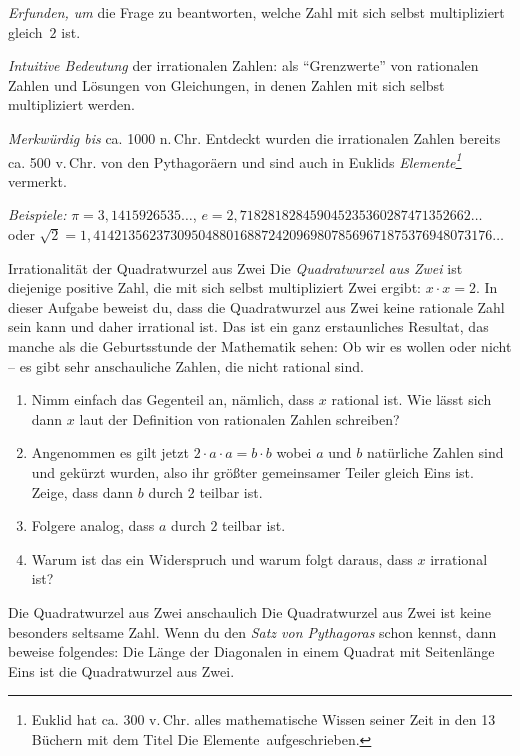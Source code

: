 \documentclass{zirkelblatt1415}
\begin{document}
\emph{Erfunden, um} die Frage zu beantworten, welche Zahl mit sich selbst multipliziert gleich~$2$ ist.

\emph{Intuitive Bedeutung} der irrationalen Zahlen: als "`Grenzwerte"' von rationalen Zahlen und Lösungen von Gleichungen, in denen Zahlen mit sich selbst multipliziert werden.

\emph{Merkwürdig bis} ca. 1000 n.\,Chr. Entdeckt wurden die irrationalen Zahlen bereits ca. 500 v.\,Chr. von den Pythagoräern und sind auch in Euklids \emph{Elemente\footnote{Euklid hat ca. 300 v.\,Chr. alles mathematische Wissen seiner Zeit in den 13 B\"uchern mit dem Titel \glqq Die Elemente\grqq\ aufgeschrieben.}} vermerkt.

\emph{Beispiele:} $\pi=3{,}1415926535\ldots$, $e=2{,}718281828459045235360287471352662\ldots$ oder $\sqrt{2}=1{,}414213562373095048801688724209698078569671875376948073176\ldots$


\begin{aufgabe}{Irrationalität der Quadratwurzel aus Zwei}
Die \emph{Quadratwurzel aus Zwei} ist diejenige positive Zahl, die mit sich selbst multipliziert Zwei ergibt: $x \cdot x = 2$.
In dieser Aufgabe beweist du, dass die Quadratwurzel aus Zwei keine rationale
Zahl sein kann und daher irrational ist. Das ist ein ganz erstaunliches Resultat, das manche als die Geburtsstunde der Mathematik sehen: Ob wir es wollen oder nicht -- es gibt sehr anschauliche Zahlen, die nicht rational sind.
\begin{enumerate}
   \item Nimm einfach das Gegenteil an, nämlich, dass $x$ rational ist. Wie lässt sich dann $x$ laut der Definition von rationalen Zahlen schreiben?
   \item Angenommen es gilt jetzt $2\cdot a\cdot a=b\cdot b$ wobei $a$ und $b$ natürliche Zahlen sind und gekürzt wurden, also ihr größter gemeinsamer Teiler gleich Eins ist. Zeige, dass dann $b$ durch $2$ teilbar ist.
   \item Folgere analog, dass $a$ durch $2$ teilbar ist.
   \item Warum ist das ein Widerspruch und warum folgt daraus, dass $x$ irrational ist?
 \end{enumerate}
\end{aufgabe}

\begin{aufgabe}{Die Quadratwurzel aus Zwei anschaulich}
Die Quadratwurzel aus Zwei ist keine besonders seltsame Zahl. Wenn du den
\emph{Satz von Pythagoras} schon kennst, dann beweise folgendes: Die Länge der Diagonalen in einem Quadrat mit Seitenlänge Eins ist die Quadratwurzel aus Zwei.
\end{aufgabe}
\end{document}
